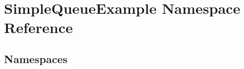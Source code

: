 \hypertarget{namespace_simple_queue_example}{}\section{Simple\+Queue\+Example Namespace Reference}
\label{namespace_simple_queue_example}
\subsection*{Namespaces}
\begin{DoxyCompactItemize}
\end{DoxyCompactItemize}
